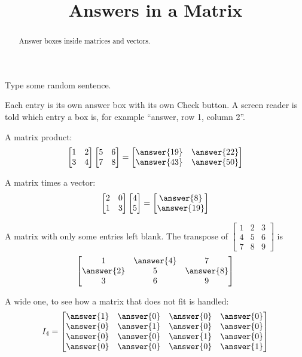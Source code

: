 \documentclass{ximera}
\title{Answers in a Matrix}
\begin{document}
\begin{abstract}
Answer boxes inside matrices and vectors.
\end{abstract}
\maketitle

Type some random sentence. 

Each entry is its own answer box with its own Check button. A screen reader
is told which entry a box is, for example ``answer, row 1, column 2''.

\begin{problem}
A matrix product:
\[
\begin{bmatrix} 1 & 2 \\ 3 & 4 \end{bmatrix}
\begin{bmatrix} 5 & 6 \\ 7 & 8 \end{bmatrix}
=
\begin{bmatrix} \answer{19} & \answer{22} \\ \answer{43} & \answer{50} \end{bmatrix}
\]
\end{problem}

\begin{problem}
A matrix times a vector:
\[
\begin{bmatrix} 2 & 0 \\ 1 & 3 \end{bmatrix}
\begin{bmatrix} 4 \\ 5 \end{bmatrix}
=
\begin{bmatrix} \answer{8} \\ \answer{19} \end{bmatrix}
\]
\end{problem}

\begin{problem}
A matrix with only some entries left blank. The transpose of
$\begin{bmatrix} 1 & 2 & 3 \\ 4 & 5 & 6 \\ 7 & 8 & 9 \end{bmatrix}$ is
\[
\begin{bmatrix} 1 & \answer{4} & 7 \\ \answer{2} & 5 & \answer{8} \\ 3 & 6 & 9 \end{bmatrix}
\]
\end{problem}

\begin{problem}
A wide one, to see how a matrix that does not fit is handled:
\[
I_4 =
\begin{bmatrix}
\answer{1} & \answer{0} & \answer{0} & \answer{0} \\
\answer{0} & \answer{1} & \answer{0} & \answer{0} \\
\answer{0} & \answer{0} & \answer{1} & \answer{0} \\
\answer{0} & \answer{0} & \answer{0} & \answer{1}
\end{bmatrix}
\]
\end{problem}
\end{document}
